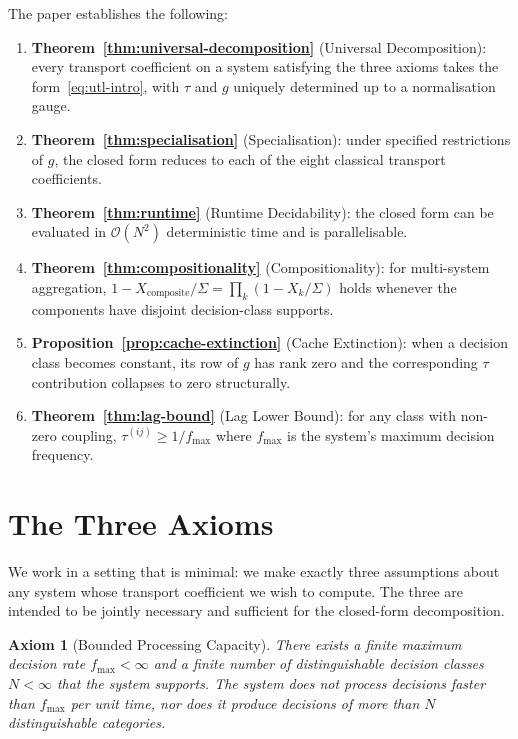 \documentclass[twocolumn,11pt,a4paper]{article}
\newtheorem{axiom}{Axiom}
\newcommand{\TP}{X}
\newcommand{\lag}{\tau}
\newcommand{\cpl}{g}
\newcommand{\classcount}{N}
\begin{document}
The paper establishes the following:
\begin{enumerate}[nosep,leftmargin=*]
\item \textbf{Theorem~\ref{thm:universal-decomposition}} (Universal Decomposition): every transport coefficient on a system satisfying the three axioms takes the form~\eqref{eq:utl-intro}, with $\lag$ and $\cpl$ uniquely determined up to a normalisation gauge.
\item \textbf{Theorem~\ref{thm:specialisation}} (Specialisation): under specified restrictions of $\cpl$, the closed form reduces to each of the eight classical transport coefficients.
\item \textbf{Theorem~\ref{thm:runtime}} (Runtime Decidability): the closed form can be evaluated in $\mathcal{O}(\classcount^2)$ deterministic time and is parallelisable.
\item \textbf{Theorem~\ref{thm:compositionality}} (Compositionality): for multi-system aggregation, $1 - \TP_{\mathrm{composite}}/\Sigma = \prod_k (1 - \TP_k/\Sigma)$ holds whenever the components have disjoint decision-class supports.
\item \textbf{Proposition~\ref{prop:cache-extinction}} (Cache Extinction): when a decision class becomes constant, its row of $\cpl$ has rank zero and the corresponding $\lag$ contribution collapses to zero structurally.
\item \textbf{Theorem~\ref{thm:lag-bound}} (Lag Lower Bound): for any class with non-zero coupling, $\lag^{(ij)} \geq 1/f_{\max}$ where $f_{\max}$ is the system's maximum decision frequency.
\end{enumerate}

\section{The Three Axioms}
\label{sec:axioms}

We work in a setting that is minimal: we make exactly three assumptions about any system whose transport coefficient we wish to compute. The three are intended to be jointly necessary and sufficient for the closed-form decomposition.

\begin{axiom}[Bounded Processing Capacity]
\label{ax:bounded}
There exists a finite maximum decision rate $f_{\max} < \infty$ and a finite number of distinguishable decision classes $\classcount < \infty$ that the system supports. The system does not process decisions faster than $f_{\max}$ per unit time, nor does it produce decisions of more than $\classcount$ distinguishable categories.
\end{axiom}
\end{document}
